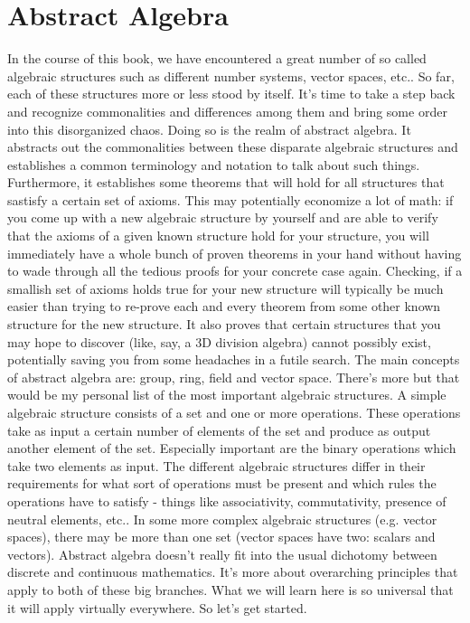 \chapter{Abstract Algebra}
In the course of this book, we have encountered a great number of so called algebraic structures such as different number systems, vector spaces, etc.. So far, each of these structures more or less stood by itself. It's time to take a step back and recognize commonalities and differences among them and bring some order into this disorganized chaos. Doing so is the realm of abstract algebra. It abstracts out the commonalities between these disparate algebraic structures and establishes a common terminology and notation to talk about such things. Furthermore, it establishes some theorems that will hold for all structures that sastisfy a certain set of axioms. This may potentially economize a lot of math: if you come up with a new algebraic structure by yourself and are able to verify that the axioms of a given known structure hold for your structure, you will immediately have a whole bunch of proven theorems in your hand without having to wade through all the tedious proofs for your concrete case again. Checking, if a smallish set of axioms holds true for your new structure will typically be much easier than trying to re-prove each and every theorem from some other known structure for the new structure. It also proves that certain structures that you may hope to discover (like, say, a 3D division algebra) cannot possibly exist, potentially saving you from some headaches in a futile search. The main concepts of abstract algebra are: group, ring, field and vector space. There's more but that would be my personal list of the most important algebraic structures. A simple algebraic structure consists of a set and one or more operations. These operations take as input a certain number of elements of the set and produce as output another element of the set. Especially important are the binary operations which take two elements as input. The different algebraic structures differ in their requirements for what sort of operations must be present and which rules the operations have to satisfy - things like associativity, commutativity, presence of neutral elements, etc.. In some more complex algebraic structures (e.g. vector spaces), there may be more than one set (vector spaces have two: scalars and vectors). Abstract algebra doesn't really fit into the usual dichotomy between discrete and continuous mathematics. It's more about overarching principles that apply to both of these big branches. What we will learn here is so universal that it will apply virtually everywhere. So let's get started.


